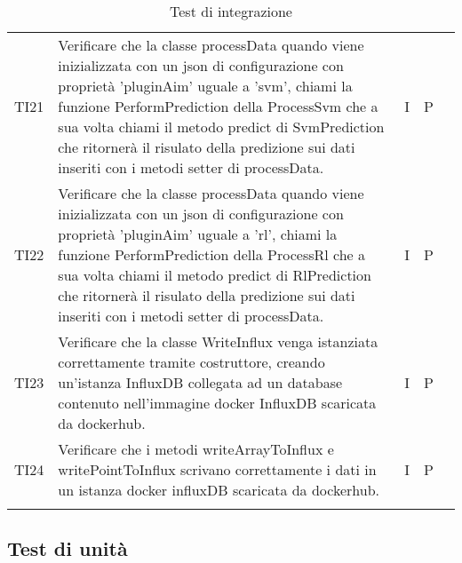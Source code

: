 \begin{longtable} {
		>{}p{15mm} 
		>{}p{79.5mm}
		>{}p{15mm} 
		>{}p{15mm}
		>{}p{0mm}}
	TI21	& Verificare che la classe processData quando viene inizializzata con un json di configurazione con proprietà 'pluginAim' uguale a 'svm', chiami la funzione PerformPrediction della ProcessSvm che a sua volta chiami il metodo predict di SvmPrediction che ritornerà il risulato della predizione sui dati inseriti con i metodi setter di processData.& I & P &\TBstrut \\ [2mm]
	TI22	& Verificare che la classe processData quando viene inizializzata con un json di configurazione con proprietà 'pluginAim' uguale a 'rl', chiami la funzione PerformPrediction della ProcessRl che a sua volta chiami il metodo predict di RlPrediction che ritornerà il risulato della predizione sui dati inseriti con i metodi setter di processData.& I & P &\TBstrut \\ [2mm]
	TI23	& Verificare che la classe WriteInflux venga istanziata correttamente tramite costruttore, creando un'istanza InfluxDB collegata ad un database contenuto nell'immagine docker InfluxDB scaricata da dockerhub.& I & P &\TBstrut \\ [2mm]
	TI24	& Verificare che i metodi writeArrayToInflux e writePointToInflux scrivano correttamente i dati in un istanza docker influxDB scaricata da dockerhub.& I & P &\TBstrut \\ [2mm]
	
	\rowcolor{white}
	\caption{Test di integrazione}
\end{longtable}



\subsection{Test di unità}

